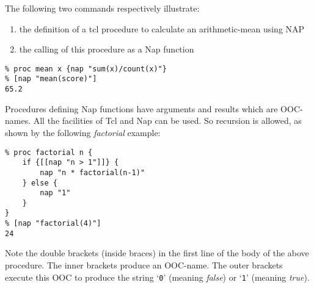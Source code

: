     

The following two commands respectively illustrate:
    \begin{enumerate}
      \item the definition of a tcl procedure to calculate an
      arithmetic-mean using NAP
      \item the calling of this procedure as a Nap function
    \end{enumerate}
    \begin{verbatim}
% proc mean x {nap "sum(x)/count(x)"}
% [nap "mean(score)"]
65.2
\end{verbatim}

    

Procedures defining Nap functions have arguments and results
    which are OOC-names. All the facilities of Tcl and Nap can be used.
    So recursion is allowed, as shown by the following 
    \emph{factorial} example:
    \begin{verbatim}
% proc factorial n {
    if {[[nap "n > 1"]]} {
        nap "n * factorial(n-1)"
    } else {
        nap "1"
    }
}
% [nap "factorial(4)"]
24
\end{verbatim}

    

Note the double brackets (inside braces) in the first line of
    the body of the above procedure. The inner brackets produce an
    OOC-name. The outer brackets execute this OOC to produce the string
`\texttt{0}' (meaning \emph{false}) or `\texttt{1}' (meaning \emph{true}).

